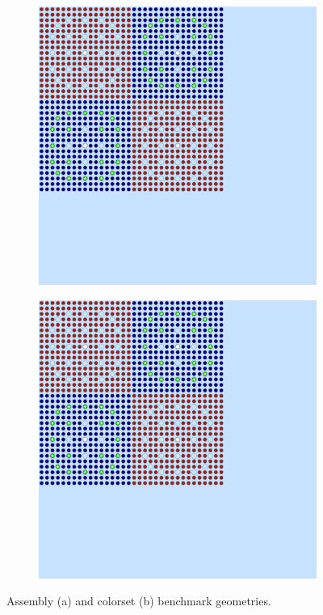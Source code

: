 \begin{figure}[h!]
\centering
\begin{subfigure}{0.45\textwidth}
  \centering
  \includegraphics[width=0.8\linewidth]{figures/assm_geometry}
  \caption{}
  \label{fig:benchmarks}
\end{subfigure}
\begin{subfigure}{0.45\textwidth}
  \centering
  \includegraphics[width=0.8\linewidth]{figures/colorset_geometry}
  \caption{}
  \label{fig:benchmarks-colorset}
\end{subfigure}
\caption{Assembly (a) and colorset (b) benchmark geometries.}
\label{fig:benchmarks-materials}
\end{figure}


